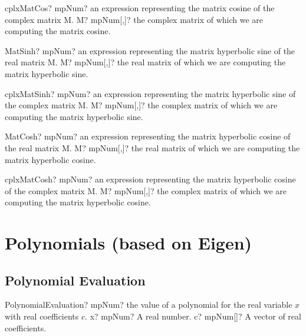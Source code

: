 \documentclass[12pt,a4paper,openany]{book}
\begin{document}
\begin{mpFunctionsExtract}
\mpFunctionOne
{cplxMatCos? mpNum? an expression representing the matrix cosine of the complex matrix M.}
{M? mpNum[,]? the complex matrix of which we are computing the matrix cosine.}
\end{mpFunctionsExtract}

\begin{mpFunctionsExtract}
\mpFunctionOne
{MatSinh? mpNum? an expression representing the matrix hyperbolic sine of the real matrix M.}
{M? mpNum[,]? the real matrix of which we are computing the matrix hyperbolic sine.}
\end{mpFunctionsExtract}

\begin{mpFunctionsExtract}
\mpFunctionOne
{cplxMatSinh? mpNum? an expression representing the matrix hyperbolic sine of the complex matrix M.}
{M? mpNum[,]? the complex matrix of which we are computing the matrix hyperbolic sine.}
\end{mpFunctionsExtract}

\begin{mpFunctionsExtract}
\mpFunctionOne
{MatCosh? mpNum? an expression representing the matrix hyperbolic cosine of the real matrix M.}
{M? mpNum[,]? the real matrix of which we are computing the matrix hyperbolic cosine.}
\end{mpFunctionsExtract}

\begin{mpFunctionsExtract}
\mpFunctionOne
{cplxMatCosh? mpNum? an expression representing the matrix hyperbolic cosine of the complex matrix M.}
{M? mpNum[,]? the complex matrix of which we are computing the matrix hyperbolic cosine.}
\end{mpFunctionsExtract}

\chapter{Polynomials (based on Eigen)}

\section{Polynomial Evaluation}

\begin{mpFunctionsExtract}
\mpFunctionTwo
{PolynomialEvaluation? mpNum? the value of a polynomial for the real variable $x$ with real coefficients $c$.}
{x? mpNum? A real number.}
{c? mpNum[]? A vector of real coefficients.}
\end{mpFunctionsExtract}
\end{document}
